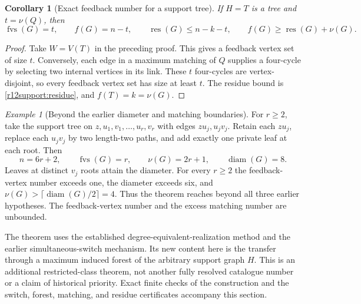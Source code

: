\documentclass[11pt,a4paper]{article}
\newtheorem{corollary}[theorem]{Corollary}
\theoremstyle{definition}\newtheorem{definition}[theorem]{Definition}
\theoremstyle{remark}\newtheorem{remark}[theorem]{Remark}
\newtheorem{example}[theorem]{Example}
\newcommand{\res}{\operatorname{res}}
\newcommand{\diam}{\operatorname{diam}}
\begin{document}
\begin{corollary}[Exact feedback number for a support tree]
\label{r12support:tree}
If $H=T$ is a tree and $t=\nu(Q)$, then
\[
 \operatorname{fvs}(G)=t,\qquad f(G)=n-t,\qquad
 \res(G)\le n-k-t,
 \qquad f(G)\ge\res(G)+\nu(G).
\]
\end{corollary}
\begin{proof}
Take $W=V(T)$ in the preceding proof. This gives a feedback vertex
set of size $t$. Conversely, each edge in a maximum matching of $Q$
supplies a four-cycle by selecting two internal vertices in its link.
These $t$ four-cycles are vertex-disjoint, so every feedback vertex
set has size at least $t$. The residue bound is
\eqref{r12support:residue}, and $f(T)=k=\nu(G)$.
\end{proof}

\begin{example}[Beyond the earlier diameter and matching boundaries]
\label{r12support:beyond}
For $r\ge2$, take the support tree on
$z,u_1,v_1,\ldots,u_r,v_r$ with edges $zu_j,u_jv_j$.
Retain each $zu_j$, replace each $u_jv_j$ by two length-two paths,
and add exactly one private leaf at each root. Then
\[
 n=6r+2,\qquad \operatorname{fvs}(G)=r,\qquad
 \nu(G)=2r+1,\qquad \diam(G)=8.
\]
Leaves at distinct $v_j$ roots attain the diameter. For every $r\ge2$
the feedback-vertex number exceeds one, the diameter exceeds six,
and $\nu(G)>\lceil\diam(G)/2\rceil=4$. Thus the theorem reaches
beyond all three earlier hypotheses. The feedback-vertex number and
the excess matching number are unbounded.
\end{example}

The theorem uses the established degree-equivalent-realization method
and the earlier simultaneous-switch mechanism. Its new content here
is the transfer through a maximum induced forest of the arbitrary
support graph $H$. This is an additional restricted-class theorem,
not another fully resolved catalogue number or a claim of historical
priority. Exact finite checks of the construction and the switch,
forest, matching, and residue certificates accompany this section.
\end{document}
